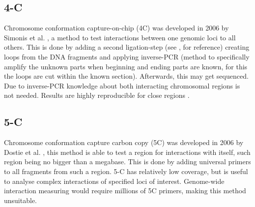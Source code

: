 \subsection{4-C}\label{sec:4C}

Chromosome conformation capture-on-chip (4C) was developed in 2006 by Simonis
et al. \cite{simonis2006nuclear}, a method to test interactions between
one genomic loci to all others. This is done by adding a second ligation-step
(see ,  for reference) creating loops from
the DNA fragments and applying inverse-PCR (method to specifically amplify the
unknown parts when beginning and ending parts are known, for this the loops are
cut within the known section). Afterwards, this may get sequenced. Due to
inverse-PCR knowledge about both interacting chromosomal regions is not needed.
Results are highly reproducible for close regions .





\subsection{5-C}\label{sec:5C}

Chromosome conformation capture carbon copy (5C) was developed in 2006 by
Dostie et al. \cite{dostie2006chromosome}, this method is able to test a region
for interactions with itself, such region being no bigger than a megabase. This
is done by adding universal primers to all fragments from such a region.
5-C has relatively low coverage, but is useful to analyse complex interactions
of specified loci of interest. Genome-wide interaction measuring would require
millions of 5C primers, making this method unsuitable.

